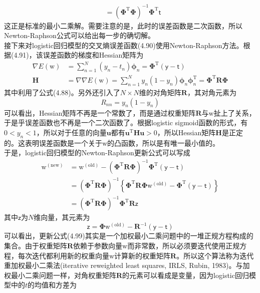 \documentclass[b5paper]{book}
\numberwithin{equation}{chapter}
\newcommand {\bw} {\boldsymbol{\mathrm{w}}}
\newcommand {\sft} {\boldsymbol{\mathsf{t}}}
\newcommand {\sfy} {\boldsymbol{\mathsf{y}}}
\newcommand {\rmT} {\mathrm{T}}
\newcommand {\bfPhi} {\boldsymbol{\Phi}}
\newcommand {\bfphi} {\boldsymbol{\phi}}
\begin{document}
{\begin{equation}
\begin{split}
		&= \left(\bfPhi^{\rmT}\bfPhi\right)^{-1} \bfPhi^{\rmT} \sft
	\end{split}
	\end{equation}
	这正是标准的最小二乘解。需要注意的是，此时的误差函数是二次函数，所以Newton-Raphson公式可以给出每一步的确切解。\\
	\indent 接下来对logistic回归模型的交叉熵误差函数(4.90)使用Newton-Raphson方法。根据(4.91)，该误差函数的梯度和Hessian矩阵为
	\begin{align}
		\nabla E(\bw) &= \sum_{n=1}^N (y_n - t_n)\bfphi_n = \bfPhi^{\rmT}(\sfy - \sft)\\
		\mathbf{H} &= \nabla \nabla E(\bw) = \sum_{n=1}^N y_n (1-y_n)\bfphi_n \bfphi_n^{\rmT} = \bfPhi^{\rmT} \mathbf{R} \bfPhi
	\end{align}
	其中利用了公式(4.88)。另外还引入了$N \times N$维的对角矩阵$\mathbf{R}$，其对角元素为
	\begin{equation}
		R_{nn} = y_n(1 - y_n)
	\end{equation}
	可以看出，Hessian矩阵不再是一个常数了，而是通过权重矩阵$\mathbf{R}$与$\bw$扯上了关系，于是乎误差函数也不再是一个二次函数了。根据logistic sigmoid函数的形式，有$0 < y_n <1$，所以对于任意的向量$\mathbf{u}$都有$\mathbf{u}^{\rmT}\mathbf{H}\mathbf{u} > 0$，所以Hessian矩阵$\mathbf{H}$是正定的。这表明误差函数是一个关于$\bw$的凸函数，所以是有唯一最小值的。\\
	\indent 于是，logistic回归模型的Newton-Raphson更新公式可以写成
	\begin{equation}
	\begin{split}
		\bw^{(\mathrm{new})} &= \bw^{(\mathrm{old})} - (\bfPhi^{\rmT} \mathbf{R} \bfPhi)^{-1}\bfPhi^{\rmT}(\sfy - \sft)\\
		&= (\bfPhi^{\rmT} \mathbf{R} \bfPhi)^{-1} \left\{\bfPhi^{\rmT} \mathbf{R} \bfPhi \bw^{(\mathrm{old})} - \bfPhi^{\rmT} (\sfy - \sft)\right\} \\
		&= (\bfPhi^{\rmT} \mathbf{R} \bfPhi)^{-1} \bfPhi^{\rmT}\mathbf{R}\boldsymbol{\mathsf{z}}
	\end{split}
	\end{equation}
	其中$\boldsymbol{\mathsf{z}}$为$N$维向量，其元素为
	\begin{equation}
		\boldsymbol{\mathsf{z}} = \bfPhi \bw^{(\mathrm{old})} - \mathbf{R}^{-1}(\sfy - \sft)
	\end{equation}
	可以看出，更新公式(4.99)其实是一个加权最小二乘问题中的一堆正规方程构成的集合。由于权重矩阵$\mathbf{R}$依赖于参数向量$\bw$而非常数，所以必须要迭代使用正规方程，每次迭代都利用新的权重向量$\bw$计算新的权重矩阵$\mathbf{R}$。所以这个算法称为迭代重加权最小二乘法(iterative reweighted least squares, IRLS, Rubin, 1983)。与加权最小二乘问题一样，对角权重矩阵$\mathbf{R}$的元素可以看成是变量，因为logistic回归模型中的$t$的均值和方差为
}
\end{document}

